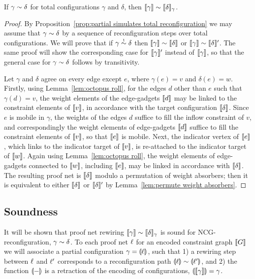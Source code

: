 \documentclass{lmcs}
\let\capsabbrev=\uppercase
\begin{document}
\begin{lemma}
\label{lem:completeness}
If $\gamma\perm\delta$ for total configurations $\gamma$ and $\delta$, then $\itn\gamma\perm\itn\delta_\gamma$.
\end{lemma}

\begin{proof}
By Proposition~\ref{prop:partial simulates total reconfiguration} we may assume that $\gamma\perm\delta$ by a sequence of reconfiguration steps over total configurations.
%
We will prove that if $\gamma\perm*\delta$ then $\itn\gamma\perm\itn\delta$ or $\itn\gamma\perm\itn\delta'$.
%
The same proof will show the corresponding case for $\llbracket\gamma\rrbracket'$ instead of $\llbracket\gamma\rrbracket$, so that the general case for $\gamma\perm\delta$ follows by transitivity.



Let $\gamma$ and $\delta$ agree on every edge except $e$, where $\gamma(e)=v$ and $\delta(e)=w$.
%
Firstly, using Lemma~\ref{lem:octopus roll}, for the edges $d$ other than $e$ such that $\gamma(d)=v$, the weight elements of the edge-gadgets $\llbracket d\rrbracket$ may be linked to the constraint elements of $\llbracket v\rrbracket$, in accordance with the target configuration $\llbracket\delta\rrbracket$.
%
Since $e$ is mobile in $\gamma$, the weights of the edges $d$ suffice to fill the inflow constraint of $v$, and correspondingly the weight elements of edge-gadgets $\llbracket d\rrbracket$ suffice to fill the constraint elements of $\llbracket v\rrbracket$, so that $\llbracket e\rrbracket$ is mobile.
%
Next, the indicator vertex of $\llbracket e\rrbracket$, which links to the indicator target of $\llbracket v\rrbracket$, is re-attached to the indicator target of $\llbracket w\rrbracket$.
%
Again using Lemma~\ref{lem:octopus roll}, the weight elements of edge-gadgets connected to $\llbracket w\rrbracket$, including $\llbracket e\rrbracket$, may be linked in accordance with $\llbracket\delta\rrbracket$.
%
The resulting proof net is $\llbracket\delta\rrbracket$ modulo a permutation of weight absorbers; then it is equivalent to either $\llbracket\delta\rrbracket$ or $\llbracket\delta\rrbracket'$ by Lemma~\ref{lem:permute weight absorbers}.
\end{proof}



\subsection*{Soundness}


It will be shown that proof net rewiring $\itn\gamma\perm\itn\delta_\gamma$ is sound for \capsabbrev{ncg}-reconfiguration, $\gamma\perm\delta$.
%
To each proof net $\ell$ for an encoded constraint graph $\llbracket G\rrbracket$ we will associate a partial configuration $\gamma=\llparenthesis\ell\rrparenthesis$, such that 1) a rewiring step between $\ell$ and $\ell'$ corresponds to a reconfiguration path $\coitn\links\perm\coitn{\links'}$, and 2) the function $\llparenthesis-\rrparenthesis$ is a retraction of the encoding of configurations, $\llparenthesis\llbracket\gamma\rrbracket\rrparenthesis=\gamma$.
\end{document}
